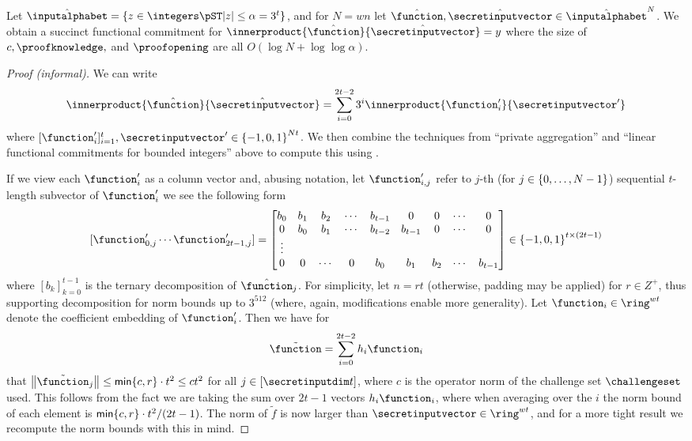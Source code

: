 \begin{theorem}
        Let $\hat{\inputalphabet} =\set{z \in \integers \pST |z| \leq \alpha = 3^{t}}$, and for $N=wn$ let $\hat{\function}, \hat{\secretinputvector} \in \hat{\inputalphabet}^{N}$. We obtain a succinct functional commitment for $\innerproduct{\hat{\function}}{\hat{\secretinputvector}} = y$ where the size of $c,\proofknowledge,$ and $\proofopening$ are all $O(\log N + \log\log \alpha)$.
\end{theorem}

\begin{proof}[Proof (informal)]
We can write
\[
        \innerproduct{\hat{\function}}{\hat{\secretinputvector}} = \sum_{i=0}^{2t-2} 3^{i} \innerproduct{\function'_i}{\secretinputvector'} \label{eq:decomposed-ck}
\]
where $[\function'_i]_{i=1}^t,\secretinputvector' \in \set{-1,0,1}^{Nt}$. We then combine the techniques from ``private aggregation'' and ``linear functional commitments for bounded integers'' above to compute this using \sys.

If we view each $\function'_{i}$ as a column vector and, abusing notation, let $\function'_{i,j}$ refer to $j$-th (for $j \in \set{0,\ldots,N-1}$) sequential $t$-length subvector of $\function'_{i}$ we see the following form
\[
        [\function'_{0,j} \cdots \function'_{2t-1,j}] = 
        \begin{bmatrix}
        b_0 & b_1 & b_2 & \cdots & b_{t-1} & 0 & 0 & \cdots & 0 \\
        0 & b_0 & b_1 & \cdots & b_{t-2} & b_{t-1} & 0 & \cdots & 0 \\
        \vdots \\
        0 & 0 & \cdots & 0 & b_0  & b_1 & b_2 & \cdots &  b_{t-1}
        \end{bmatrix}
        \in \set{-1,0,1}^{t\times (2t-1)}
\]
where $[b_k]_{k=0}^{t-1}$ is the ternary decomposition of $\hat{\function}_j$. For simplicity, let $n = rt$ (otherwise, padding may be applied) for $r \in Z^{+}$, thus supporting decomposition for norm bounds up to $3^{512}$ (where, again, modifications enable more generality). Let $\function_i \in \ring^{wt}$ denote the coefficient embedding of $\function'_i$. Then we have for
\[
        \tilde{\function} = \sum_{i=0}^{2t-2} h_i \function_{i}
\]
that $\norm{\tilde{\function}_j} \leq \mathsf{min} \set{c,r} \cdot t^2 \leq c t^2$ for all $j \in [\secretinputdim t]$, where $c$ is the operator norm of the challenge set $\challengeset$ used. This follows from the fact we are taking the sum over $2t-1$ vectors $h_i \function_{i}$, where when averaging over the $i$ the norm bound of each element is $\mathsf{min} \set{c,r} \cdot t^2/(2t-1)$. The norm of $\tilde{f}$ is now larger than $\secretinputvector \in \ring^{wt}$, and for a more tight result we recompute the norm bounds with this in mind.


\end{proof}
